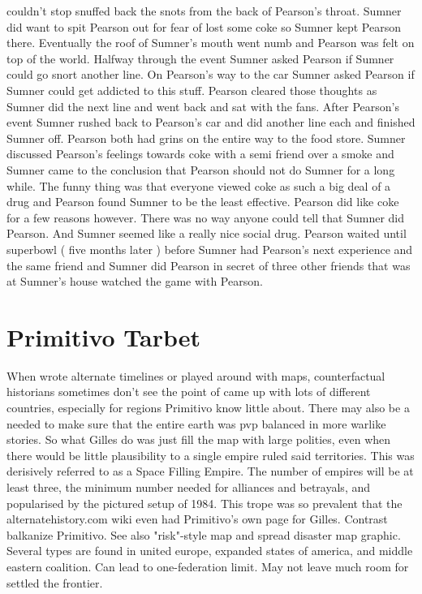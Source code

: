 \documentclass[12pt]{book}
\begin{document}
couldn't stop snuffed back the snots from the back of Pearson's throat. Sumner did want to spit Pearson out for fear of lost some coke so Sumner kept Pearson there. Eventually the roof of Sumner's mouth went numb and Pearson was felt on top of the world. Halfway through the event Sumner asked Pearson if Sumner could go snort another line. On Pearson's way to the car Sumner asked Pearson if Sumner could get addicted to this stuff. Pearson cleared those thoughts as Sumner did the next line and went back and sat with the fans. After Pearson's event Sumner rushed back to Pearson's car and did another line each and finished Sumner off. Pearson both had grins on the entire way to the food store. Sumner discussed Pearson's feelings towards coke with a semi friend over a smoke and Sumner came to the conclusion that Pearson should not do Sumner for a long while. The funny thing was that everyone viewed coke as such a big deal of a drug and Pearson found Sumner to be the least effective. Pearson did like coke for a few reasons however. There was no way anyone could tell that Sumner did Pearson. And Sumner seemed like a really nice social drug. Pearson waited until superbowl ( five months later ) before Sumner had Pearson's next experience and the same friend and Sumner did Pearson in secret of three other friends that was at Sumner's house watched the game with Pearson.



\chapter{Primitivo Tarbet}

When wrote alternate timelines or played around with maps, counterfactual historians sometimes don't see the point of came up with lots of different countries, especially for regions Primitivo know little about. There may also be a needed to make sure that the entire earth was pvp balanced in more warlike stories. So what Gilles do was just fill the map with large polities, even when there would be little plausibility to a single empire ruled said territories. This was derisively referred to as a Space Filling Empire. The number of empires will be at least three, the minimum number needed for alliances and betrayals, and popularised by the pictured setup of 1984. This trope was so prevalent that the alternatehistory.com wiki even had Primitivo's own page for Gilles. Contrast balkanize Primitivo. See also "risk"-style map and spread disaster map graphic. Several types are found in united europe, expanded states of america, and middle eastern coalition. Can lead to one-federation limit. May not leave much room for settled the frontier.
\end{document}
